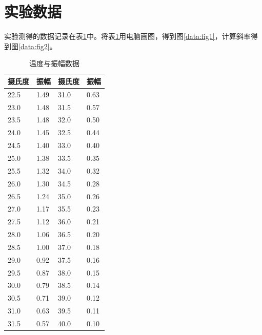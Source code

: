 \documentclass[a4paper]{article}
\begin{document}
\section{实验数据}
实验测得的数据记录在表\ref{data:table}中。将表\ref{data:table}用电脑画图，得到图\ref{data:fig1}，计算斜率得到图\ref{data:fig2}。
\begin{table}[!ht]
    \centering
    \begin{tabular}{|l|l|l|l|}
    \hline
        摄氏度 & 振幅 & 摄氏度 & 振幅 \\ \hline
        22.5 & 1.49 & 31.0 & 0.63 \\ \hline
        23.0 & 1.48 & 31.5 & 0.57 \\ \hline
        23.5 & 1.48 & 32.0 & 0.50 \\ \hline
        24.0 & 1.45 & 32.5 & 0.44 \\ \hline
        24.5 & 1.40 & 33.0 & 0.40 \\ \hline
        25.0 & 1.38 & 33.5 & 0.35 \\ \hline
        25.5 & 1.32 & 34.0 & 0.32 \\ \hline
        26.0 & 1.30 & 34.5 & 0.28 \\ \hline
        26.5 & 1.24 & 35.0 & 0.26 \\ \hline
        27.0 & 1.17 & 35.5 & 0.23 \\ \hline
        27.5 & 1.12 & 36.0 & 0.21 \\ \hline
        28.0 & 1.06 & 36.5 & 0.20 \\ \hline
        28.5 & 1.00 & 37.0 & 0.18 \\ \hline
        29.0 & 0.92 & 37.5 & 0.16 \\ \hline
        29.5 & 0.87 & 38.0 & 0.15 \\ \hline
        30.0 & 0.79 & 38.5 & 0.14 \\ \hline
        30.5 & 0.71 & 39.0 & 0.12 \\ \hline
        31.0 & 0.63 & 39.5 & 0.11 \\ \hline
        31.5 & 0.57 & 40.0 & 0.10 \\ \hline
    \end{tabular}
    \caption{温度与振幅数据}
    \label{data:table}
\end{table}
\end{document}
